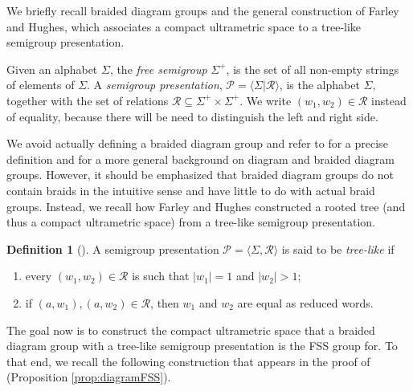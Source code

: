\documentclass[12pt]{amsart}
\numberwithin{equation}{subsection}
\theoremstyle{definition}
\theoremstyle{definition}
\newtheorem{definition}[theorem]{Definition}
\theoremstyle{remark}
\begin{document}
    We briefly recall braided diagram groups and the general construction of Farley and Hughes, which associates a compact ultrametric space to a tree-like semigroup presentation.

    Given an alphabet $\Sigma$, the \textit{free semigroup} $\Sigma^+$, is the set of all non-empty strings of elements of $\Sigma$. A \textit{semigroup presentation}, $\mathcal P = \langle \Sigma \vert \mathcal R\rangle$, is the alphabet $\Sigma$, together with the set of relations $\mathcal R \subseteq \Sigma^+\times\Sigma^+$. We write $(w_1,w_2) \in \mathcal R$ instead of equality, because there will be need to distinguish the left and right side. 


    We avoid actually defining a braided diagram group and refer to \cite{hughes2017braided} for a precise definition and \cite{GubaSapir1997} for a more general background on diagram and braided diagram groups. However, it should be emphasized that braided diagram groups do not contain braids in the intuitive sense and have little to do with actual braid groups. Instead, we recall how Farley and Hughes constructed a rooted tree (and thus a compact ultrametric space) from a tree-like semigroup presentation.  
    
    \begin{definition}[\cite{hughes2017braided}]
        A semigroup presentation $\mathcal P = \langle\Sigma, \mathcal R\rangle$ is said to be \textit{tree-like} if
        \begin{enumerate}
            \item every $(w_1,w_2) \in \mathcal R$ is such that $\vert w_1\vert = 1$ and $\vert w_2\vert > 1$;
            \item if $(a,w_1), (a,w_2) \in \mathcal R$, then $w_1$ and $w_2$ are equal as reduced words.
        \end{enumerate}
    \end{definition}

    
    The goal now is to construct the compact ultrametric space that a braided diagram group with a tree-like semigroup presentation is the FSS group for.  To that end, we recall the following construction that appears in the proof of \cite[Theorem 4.12]{hughes2017braided} (Proposition \ref{prop:diagramFSS}). 
     
\end{document}
